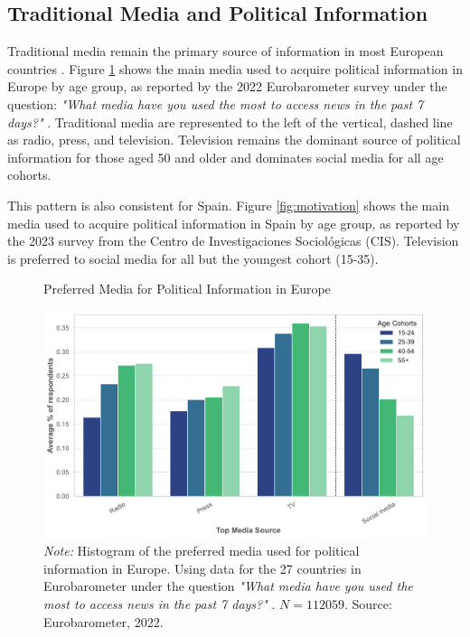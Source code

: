 \documentclass[12pt]{article}
\begin{document}
	\label{sec:context}
	
		\subsection{Traditional Media and Political Information}
	
	Traditional media remain the primary source of information in most European countries \citep{europarl2024}. Figure \ref{fig:motivation2} shows the main media used to acquire political information in Europe by age group, as reported by the 2022 Eurobarometer survey under the question: \textit{"What media have you used the most to access news in the past 7 days?" }. Traditional media are represented to the left of the vertical, dashed line as radio, press, and television. Television remains the dominant source of political information for those aged 50 and older and dominates social media for all age cohorts. 
	
	This pattern is also consistent for Spain. Figure \ref{fig:motivation} shows the main media used to acquire political information in Spain by age group, as reported by the 2023 survey from the Centro de Investigaciones Sociológicas (CIS). Television is preferred to social media for all but the youngest cohort (15-35). 
	
	
	

	
	
	\begin{figure}[!htb]
		\centering
		\caption{Preferred Media for Political Information in Europe}
		\includegraphics[width=130mm]{figures/age_cohorts_full}
		\caption*{\small \textit{Note:} Histogram of the preferred media used for political information in Europe. Using data for the 27 countries in Eurobarometer under the question \textit{"What media have you used the most to access news in the past 7 days?" }. $N=112059.$ 
			Source: Eurobarometer, 2022. }
		\label{fig:motivation2}
	\end{figure}
	
\end{document}
